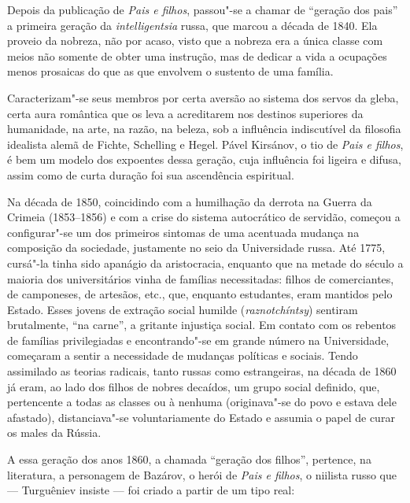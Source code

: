Depois da publicação de \emph{Pais e filhos}, passou"-se a chamar de
``geração dos pais'' a primeira geração da \emph{intelligentsia} russa,
que marcou a década de 1840. Ela proveio da nobreza, não por acaso,
visto que a nobreza era a única classe com meios não somente de obter
uma instrução, mas de dedicar a vida a ocupações menos prosaicas do que
as que envolvem o sustento de uma família.

Caracterizam"-se seus membros por certa aversão ao sistema dos servos
da gleba, certa aura romântica que os leva a acreditarem nos
destinos superiores da humanidade, na arte, na razão, na beleza, sob a influência indiscutível da filosofia idealista alemã de Fichte, Schelling e Hegel. Pável Kirsánov, o tio de \emph{Pais e filhos}, é bem um modelo dos expoentes dessa geração, cuja influência foi ligeira e difusa, assim como de curta duração foi sua ascendência espiritual.

Na década de 1850, coincidindo com a humilhação da derrota na Guerra da Crimeia (1853--1856) e
com a crise do sistema autocrático de servidão, começou a configurar"-se
um dos primeiros sintomas de uma acentuada mudança na composição da
sociedade, justamente no seio da Universidade russa. Até 1775, cursá"-la tinha
sido apanágio da aristocracia, enquanto que na metade do século  a
maioria dos universitários vinha de famílias necessitadas:
filhos de comerciantes, de camponeses, de artesãos, etc., que,
enquanto estudantes, eram mantidos pelo Estado. Esses jovens de extração
social humilde (\emph{raznotchíntsy}) sentiram brutalmente, ``na carne'', a
gritante injustiça social. Em contato com os rebentos de famílias
privilegiadas e encontrando"-se em grande número na Universidade,
começaram a sentir a necessidade de mudanças políticas e sociais.
Tendo assimilado as teorias radicais, tanto russas como estrangeiras, na
década de 1860 já eram, ao lado dos filhos de nobres decaídos, um grupo social definido, que,
pertencente a todas as classes ou à nenhuma (originava"-se do povo e estava dele afastado), distanciava"-se
voluntariamente do Estado e assumia o papel de curar os males da
Rússia.

A essa geração dos anos 1860, a chamada ``geração dos filhos'', pertence, na literatura, a personagem de Bazárov, o herói de \emph{Pais
e filhos}, o niilista russo que --- Turguêniev insiste --- foi criado a
partir de um tipo real:

